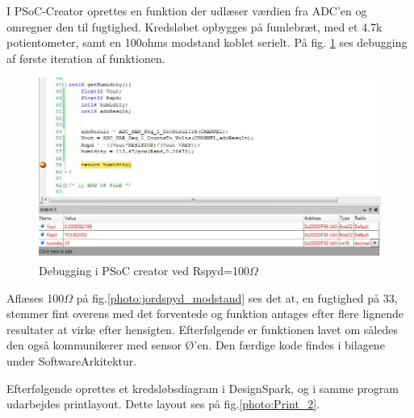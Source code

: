 I PSoC-Creator oprettes en funktion der udlæser værdien fra ADC'en og omregner den til fugtighed. Kredsløbet opbygges på fumlebræt, med et 4.7k potientometer, samt en 100ohms modstand koblet serielt. På fig. \ref{photo:debug100} ses debugging af første iteration af funktionen.

\begin{figure}[H]
	\centering 
	\includegraphics[scale=0.8]{HardwareArkitektur/Sensore/Jordfugt_billeder/debug100ohm.jpg}
	\caption{Debugging i PSoC creator ved Rspyd=100$\Omega$}
	\label{photo:debug100}
\end{figure} 

Aflæses 100$\Omega$ på fig.\ref{photo:jordspyd_modstand} ses det at, en fugtighed på 33, stemmer fint overens med det forventede og funktion antages efter flere lignende resultater at virke efter hensigten. Efterfølgende er funktionen lavet om således den også kommunikerer med sensor Ø'en. Den færdige kode findes i bilagene under SoftwareArkitektur.\newline

Efterfølgende oprettes et kredsløbsdiagram i DesignSpark, og i samme program udarbejdes printlayout. Dette layout ses på fig.\ref{photo:Print_2}.

